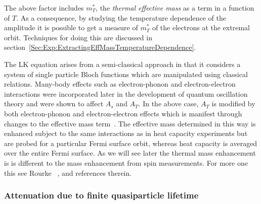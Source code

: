 The above factor includes $m^*_T$, the \emph{thermal effective mass} as a term in a function of $T$. As a consequence, by studying the temperature dependence of the amplitude it is possible to get a measure of $m^*_T$ of the electrons at the extremal orbit. Techniques for doing this are discussed in section~\ref{Sec:Exp:ExtractingEffMassTemperatureDependence}.

The \ac{LK} equation arises from a semi-classical approach in that it considers a system of single particle Bloch functions which are manipulated using classical relations. Many-body effects such as electron-phonon and electron-electron interactions were incorporated later in the development of quantum oscillation theory and were shown to affect $A_s$ and $A_T$. In the above case, $A_T$ is modified by both electron-phonon and electron-electron effects which is manifest through changes to the effective mass term~\cite{Schoenberg1984}. The effective mass determined in this way is enhanced subject to the same interactions as in heat capacity experiments but are probed for a particular Fermi surface orbit, whereas heat capacity is averaged over the entire Fermi surface. As we will see later the thermal mass enhancement is is different to the mass enhancement from spin measurements. For more one this see Rourke \etal~\cite{Rourke2010b}, \cite{Schoenberg1984} and references therein.

\subsubsection{Attenuation due to finite quasiparticle lifetime}


